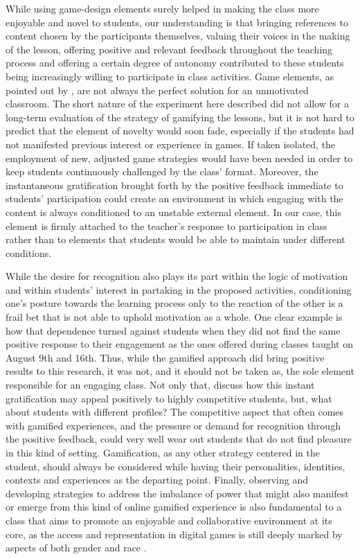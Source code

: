 \documentclass[english]{textolivre}
\begin{document}
While using game-design elements surely helped in making the class more enjoyable and novel to students, our understanding is that bringing references to content chosen by the participants themselves, valuing their voices in the making of the lesson, offering positive and relevant feedback throughout the teaching process and offering a certain degree of autonomy contributed to these students being increasingly willing to participate in class activities. Game elements, as pointed out by \textcite{koivisto2019rise}, are not always the perfect solution for an unmotivated classroom. The short nature of the experiment here described did not allow for a long-term evaluation of the strategy of gamifying the lessons, but it is not hard to predict that the element of novelty would soon fade, especially if the students had not manifested previous interest or experience in games. If taken isolated, the employment of new, adjusted game strategies would have been needed in order to keep students continuously challenged by the class’ format. Moreover, the instantaneous gratification brought forth by the positive feedback immediate to students’ participation could create an environment in which engaging with the content is always conditioned to an unstable external element. In our case, this element is firmly attached to the teacher’s response to participation in class rather than to elements that students would be able to maintain under different conditions. 

While the desire for recognition also plays its part within the logic of motivation and within students’ interest in partaking in the proposed activities, conditioning one’s posture towards the learning process only to the reaction of the other is a frail bet that is not able to uphold motivation as a whole. One clear example is how that dependence turned against students when they did not find the same positive response to their engagement as the ones offered during classes taught on August 9th and 16th. Thus, while the gamified approach did bring positive results to this research, it was not, and it should not be taken as, the sole element responsible for an engaging class. Not only that, \textcite{aguilos2022perceived} discuss how this instant gratification may appeal positively to highly competitive students, but, what about students with different profiles? The competitive aspect that often comes with gamified experiences, and the pressure or demand for recognition through the positive feedback, could very well wear out students that do not find pleasure in this kind of setting. Gamification, as any other strategy centered in the student, should always be considered while having their personalities, identities, contexts and experiences as the departing point. Finally,  observing and developing strategies to address the imbalance of power that might also manifest or emerge from this kind of online gamified experience is also fundamental to a class that aims to promote an enjoyable and collaborative environment at its core, as the access and representation in digital games is still deeply marked by aspects of both gender and race \cite{leonard2006not,kelly2023you}.
\end{document}
